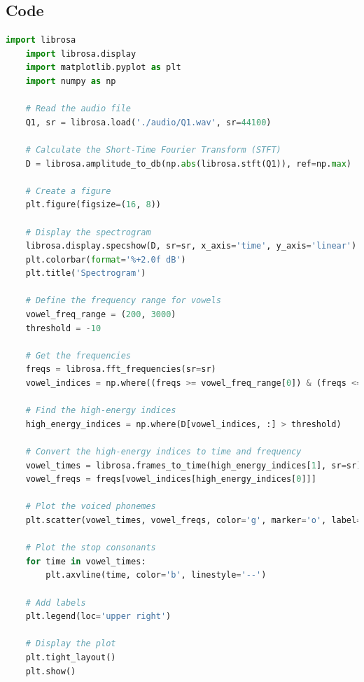 \subsection{Code}

\lstset{
    basicstyle=\small,
    breaklines=true,
    language=Python,
    showstringspaces=false,
    fontadjust=true
}
\begin{lstlisting}[language=Python, caption={Python code for Question 1}, label={code:Question1}, captionpos=b]
    import librosa
    import librosa.display
    import matplotlib.pyplot as plt
    import numpy as np

    # Read the audio file
    Q1, sr = librosa.load('./audio/Q1.wav', sr=44100)

    # Calculate the Short-Time Fourier Transform (STFT)
    D = librosa.amplitude_to_db(np.abs(librosa.stft(Q1)), ref=np.max)

    # Create a figure
    plt.figure(figsize=(16, 8))

    # Display the spectrogram
    librosa.display.specshow(D, sr=sr, x_axis='time', y_axis='linear')
    plt.colorbar(format='%+2.0f dB')
    plt.title('Spectrogram')

    # Define the frequency range for vowels
    vowel_freq_range = (200, 3000)
    threshold = -10

    # Get the frequencies
    freqs = librosa.fft_frequencies(sr=sr)
    vowel_indices = np.where((freqs >= vowel_freq_range[0]) & (freqs <= vowel_freq_range[1]))[0]

    # Find the high-energy indices
    high_energy_indices = np.where(D[vowel_indices, :] > threshold)

    # Convert the high-energy indices to time and frequency
    vowel_times = librosa.frames_to_time(high_energy_indices[1], sr=sr)
    vowel_freqs = freqs[vowel_indices[high_energy_indices[0]]]

    # Plot the voiced phonemes
    plt.scatter(vowel_times, vowel_freqs, color='g', marker='o', label='Vowel (Voiced Phoneme)')

    # Plot the stop consonants
    for time in vowel_times:
        plt.axvline(time, color='b', linestyle='--')

    # Add labels
    plt.legend(loc='upper right')

    # Display the plot
    plt.tight_layout()
    plt.show()
\end{lstlisting}

%

\newpage